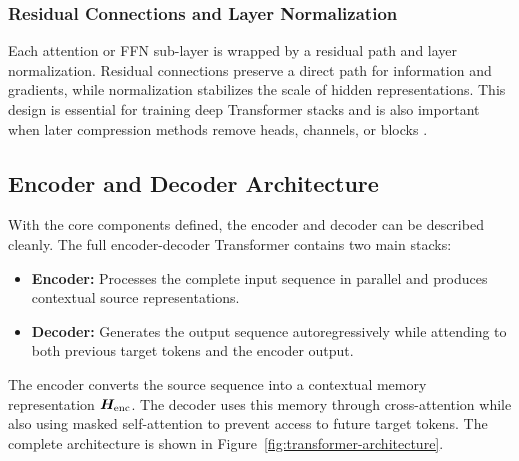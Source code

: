\subsubsection{Residual Connections and Layer Normalization}

Each attention or FFN sub-layer is wrapped by a residual path and layer normalization. Residual connections preserve a direct path for information and gradients, while normalization stabilizes the scale of hidden representations. This design is essential for training deep Transformer stacks and is also important when later compression methods remove heads, channels, or blocks \cite{vaswani2017attention,He2016,Ba2016}.

\subsection{Encoder and Decoder Architecture}

With the core components defined, the encoder and decoder can be described cleanly. The full encoder-decoder Transformer contains two main stacks:
\begin{itemize}
    \item \textbf{Encoder:} Processes the complete input sequence in parallel and produces contextual source representations.
    \item \textbf{Decoder:} Generates the output sequence autoregressively while attending to both previous target tokens and the encoder output.
\end{itemize}

The encoder converts the source sequence into a contextual memory representation $\bm{H}_{\text{enc}}$. The decoder uses this memory through cross-attention while also using masked self-attention to prevent access to future target tokens. The complete architecture is shown in Figure~\ref{fig:transformer-architecture}.

